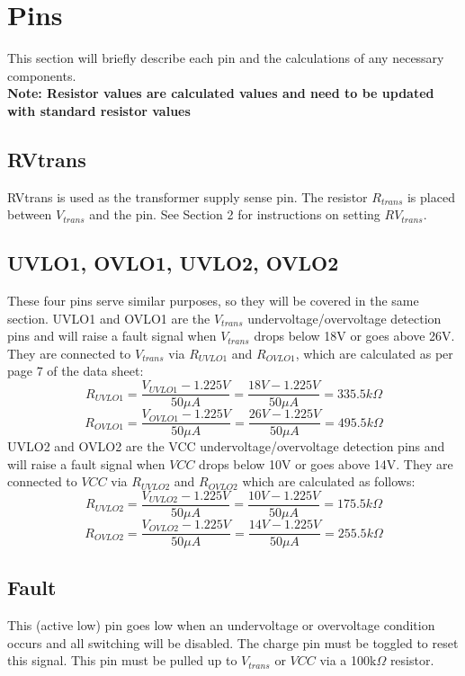 \documentclass{article}
\begin{document}
	\section{Pins}
	This section will briefly describe each pin and the calculations of any necessary components.\\
	
	\noindent \textbf{Note: Resistor values are calculated values and need to be updated with standard resistor values}
	
	\subsection{RVtrans}
	RVtrans is used as the transformer supply sense pin. The resistor $R_{trans}$ is placed between $V_{trans}$ and the pin. See Section 2 for instructions on setting $RV_{trans}$.
	
	\subsection{UVLO1, OVLO1, UVLO2, OVLO2}
	These four pins serve similar purposes, so they will be covered in the same section. UVLO1 and OVLO1 are the $V_{trans}$ undervoltage/overvoltage detection pins and will raise a fault signal when $V_{trans}$ drops below 18V or goes above 26V. They are connected to $V_{trans}$ via $R_{UVLO1}$ and $R_{OVLO1}$, which are calculated as per page 7 of the data sheet:
	\[R_{UVLO1} = \dfrac{V_{UVLO1} - 1.225V}{50\mu A} = \dfrac{18V - 1.225V}{50\mu A} = 335.5k\Omega\]
	\[R_{OVLO1} = \dfrac{V_{OVLO1} - 1.225V}{50\mu A} = \dfrac{26V - 1.225V}{50\mu A} = 495.5k\Omega\]
	UVLO2 and OVLO2 are the VCC undervoltage/overvoltage detection pins and will raise a fault signal when $VCC$ drops below 10V or goes above 14V. They are connected to $VCC$ via $R_{UVLO2}$ and $R_{OVLO2}$ which are calculated as follows:
	\[R_{UVLO2} = \dfrac{V_{UVLO2} - 1.225V}{50\mu A} = \dfrac{10V - 1.225V}{50\mu A} = 175.5k\Omega\]
	\[R_{OVLO2} = \dfrac{V_{OVLO2} - 1.225V}{50\mu A} = \dfrac{14V - 1.225V}{50\mu A} = 255.5k\Omega\]
	
	\subsection{Fault}
	This (active low) pin goes low when an undervoltage or overvoltage condition occurs and all switching will be disabled. The charge pin must be toggled to reset this signal. This pin must be pulled up to $V_{trans}$ or $VCC$ via a 100k$\Omega$ resistor.
	
\end{document}
